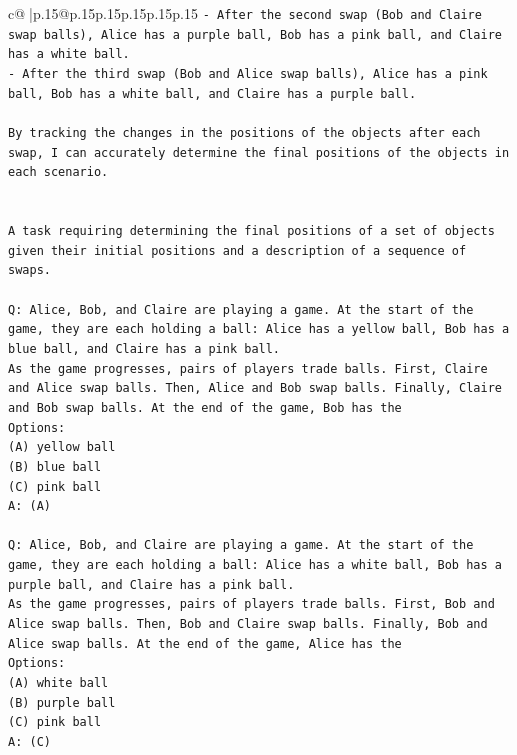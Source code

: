 \documentclass{article}
\begin{document}
{\begin{supertabular}{c@{$\;$}|p{.15\linewidth}@{}p{.15\linewidth}p{.15\linewidth}p{.15\linewidth}p{.15\linewidth}p{.15\linewidth}}
{{{\texttt{{-} After the second swap (Bob and Claire swap balls), Alice has a purple ball, Bob has a pink ball, and Claire has a white ball.} \\
\texttt{{-} After the third swap (Bob and Alice swap balls), Alice has a pink ball, Bob has a white ball, and Claire has a purple ball.} \\
\\ 
\texttt{By tracking the changes in the positions of the objects after each swap, I can accurately determine the final positions of the objects in each scenario.} \\
\\ 
\\ 
\texttt{A task requiring determining the final positions of a set of objects given their initial positions and a description of a sequence of swaps.} \\
\\ 
\texttt{Q: Alice, Bob, and Claire are playing a game. At the start of the game, they are each holding a ball: Alice has a yellow ball, Bob has a blue ball, and Claire has a pink ball.} \\
\texttt{As the game progresses, pairs of players trade balls. First, Claire and Alice swap balls. Then, Alice and Bob swap balls. Finally, Claire and Bob swap balls. At the end of the game, Bob has the} \\
\texttt{Options:} \\
\texttt{(A) yellow ball} \\
\texttt{(B) blue ball} \\
\texttt{(C) pink ball} \\
\texttt{A: (A)} \\
\\ 
\texttt{Q: Alice, Bob, and Claire are playing a game. At the start of the game, they are each holding a ball: Alice has a white ball, Bob has a purple ball, and Claire has a pink ball.} \\
\texttt{As the game progresses, pairs of players trade balls. First, Bob and Alice swap balls. Then, Bob and Claire swap balls. Finally, Bob and Alice swap balls. At the end of the game, Alice has the} \\
\texttt{Options:} \\
\texttt{(A) white ball} \\
\texttt{(B) purple ball} \\
\texttt{(C) pink ball} \\
\texttt{A: (C)} \\
\\ 
}}}
\end{supertabular}}
\end{document}

